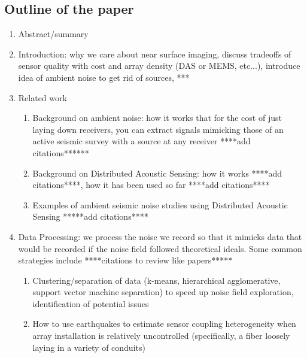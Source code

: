 \documentclass[11pt]{article}
\begin{document}
\vspace{-0.3cm}
\subsection*{Outline of the paper}
	\begin{enumerate}
	\vspace{-0.2cm}
	\item Abstract/summary
	\vspace{-0.2cm}
	\item Introduction: why we care about near surface imaging, discuss tradeoffs of sensor quality with cost and array density (DAS or MEMS, etc...), introduce idea of ambient noise to get rid of sources, ***
	\vspace{-0.2cm}
	\item Related work
		\begin{enumerate}
		\vspace{-0.2cm}
		\item Background on ambient noise: how it works that for the cost of just laying down receivers, you can extract signals mimicking those of an active seismic survey with a source at any receiver ****add citations******
		\vspace{-0.2cm}
		\item Background on Distributed Acoustic Sensing: how it works ****add citations****, how it has been used so far ****add citations****
		\vspace{-0.2cm}
		\item Examples of ambient seismic noise studies using Distributed Acoustic Sensing *****add citations****
		\end{enumerate}
	\vspace{-0.2cm}
	\item Data Processing: we process the noise we record so that it mimicks data that would be recorded if the noise field followed theoretical ideals. Some common strategies include ****citations to review like papers*****
		\begin{enumerate}
		\vspace{-0.2cm}
		\item Clustering/separation of data (k-means, hierarchical agglomerative, support vector machine separation) to speed up noise field exploration, identification of potential issues
		\vspace{-0.2cm}
		\item How to use earthquakes to estimate sensor coupling heterogeneity when array installation is relatively uncontrolled (specifically, a fiber loosely laying in a variety of conduits) 

\end{enumerate}
\end{enumerate}
\end{document}
